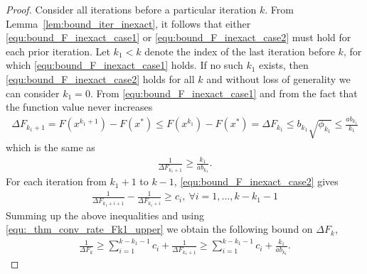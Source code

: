\documentclass[11pt]{article}
\numberwithin{equation}{section}
\begin{document}
\begin{proof}
Consider all iterations before a particular iteration $k$.  From Lemma~\ref{lem:bound_iter_inexact}, it follows that either 
 \eqref{equ:bound_F_inexact_case1} or \eqref{equ:bound_F_inexact_case2} must hold for each prior iteration.
       Let $k_1 <k$  denote the index of the last iteration before $k$,  for which \eqref{equ:bound_F_inexact_case1} holds. If no such $k_1$ exists, then \eqref{equ:bound_F_inexact_case2} holds for all $k$ and without loss of generality we can consider $k_1=0$. From \eqref{equ:bound_F_inexact_case1} and from the fact that the function value never increases
	 \begin{align}
	\label{equ:_thm_conv_rate_case1}
	    \Delta F_{k_1+1}=F(x^{k_1+1}) - F(x^*) \leq   F(x^{k_1}) - F(x^*) =\Delta F_{k_1} \leq b_{k_1} \sqrt{\phi_{k_1}} \leq  \frac {a b_{k_1}}{k_1}
	\end{align}
	which is the same as
		 \begin{align}\label{equ:_thm_conv_rate_Fk1_upper}
	  \frac{1}{\Delta F_{k_1+1}} \geq  \frac{k_1} {a b_{k_1}}.
	  \end{align}
	  For each iteration from  $k_1+1$ to $k-1$, \eqref{equ:bound_F_inexact_case2}  gives 
	\begin{align*}
	    \frac{1}{\Delta F_{k_1 + i + 1}} - \frac{1}{\Delta F_{k_1 + i}} \geq c_i, ~\forall i = 1, ..., k-k_1-1
	\end{align*}
	Summing up the above inequalities  and using \eqref{equ:_thm_conv_rate_Fk1_upper} we obtain the following bound on 
	$\Delta F_{k}$, 
	\begin{align}\label{eq:finalsum}
	    \frac{1}{\Delta F_{k }} \geq \sum_{i=1}^{k-k_1-1}c_i+  \frac{1}{\Delta F_{k_1 + 1}} \geq  
	    \sum_{i=1}^{k-k_1-1}c_i+ \frac{k_1} {a b_{k_1} }.
	\end{align}
	

\end{proof}
\end{document}
